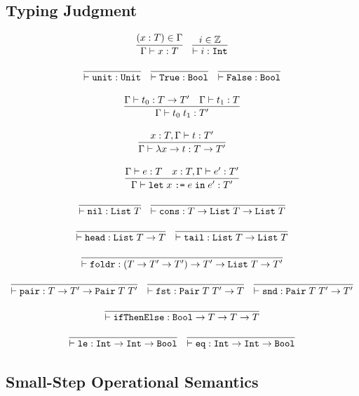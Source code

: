 \documentclass[10pt]{article}
\newcommand{\ttt}[1]{\texttt{#1}}
\newcommand{\ra}{\ensuremath{\rightarrow}}
\newcommand{\Int}{\ttt{Int}}
\newcommand{\Bool}{\ttt{Bool}}
\newcommand{\tyPair}{\ttt{Pair}}
\newcommand{\List}{\ttt{List}}
\newcommand{\letbnd}{\ttt{let}}
\newcommand{\inexpr}{\ttt{in}}
\begin{document}
\subsection{Typing Judgment}

\[
  \begin{array}{cc}
    \infer{\Gamma \vdash x : T}{(x : T) \in \Gamma}
    ~~~
    \infer{\vdash i : \ttt{Int}}{i \in \mathbb{Z}}
    \\\\
    \infer{\vdash \ttt{unit} : \ttt{Unit}}{}
    ~~~
    \infer{\vdash \ttt{True} : \ttt{Bool}}{}
    ~~~
    \infer{\vdash \ttt{False} : \ttt{Bool}}{}
    \\\\
    \infer{\Gamma \vdash t_0\; t_1 : T'}{\Gamma \vdash t_0 : T \ra T' & \Gamma \vdash t_1 : T}
    \\\\
    \infer{\Gamma \vdash \lambda x \ra t : T \ra T'}{x : T, \Gamma \vdash t : T'}
    \\\\
    \infer{\Gamma \vdash \letbnd\; x\; \ttt{:=}\; e\; \inexpr\; e' : T'}{\Gamma \vdash e : T & x : T, \Gamma \vdash e' : T'}
    \\\\
    \infer{\vdash \ttt{nil} : \List\; T}{}
    ~~~
    \infer{\vdash \ttt{cons} : T \ra \List\; T \ra \List\; T}{}
    \\\\
    \infer{\vdash \ttt{head} : \List\; T \ra T}{}
    ~~~
    \infer{\vdash \ttt{tail} : \List\; T \ra \List\; T}{}
    \\\\
    \infer{\vdash \ttt{foldr} : (T \ra T' \ra T') \ra T' \ra \List\; T \ra T'}{}
    \\\\
    \infer{\vdash \ttt{pair} : T \ra T' \ra \tyPair\; T\; T'}{}
    ~~~
    \infer{\vdash \ttt{fst} : \tyPair\; T\; T' \ra T}{}
    ~~~
    \infer{\vdash \ttt{snd} : \tyPair\; T\; T' \ra T'}{}
    \\\\
    \infer{\vdash \ttt{ifThenElse} : \Bool \ra T \ra T \ra T}{}
    \\\\
    \infer{\vdash \ttt{le} : \Int \ra \Int \ra \Bool}{}
    ~~~
    \infer{\vdash \ttt{eq} : \Int \ra \Int \ra \Bool}{}
  \end{array}
\]

\subsection{Small-Step Operational Semantics}
\end{document}
